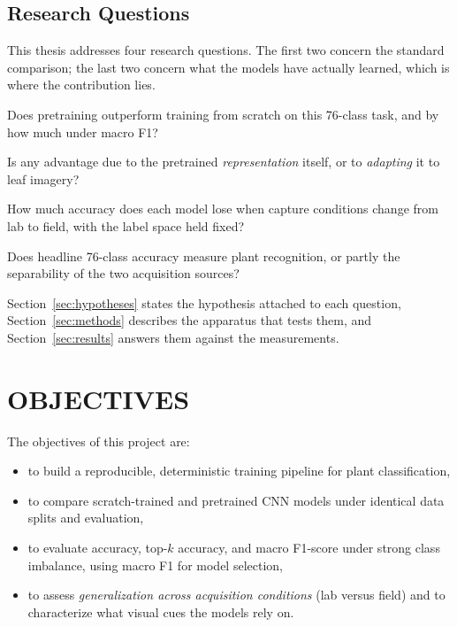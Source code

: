 \documentclass[12pt,a4paper]{article}
\begin{document}
\subsection{Research Questions}
\label{sec:rqs}
This thesis addresses four research questions. The first two concern the standard comparison; the last two concern what the models have actually learned, which is where the contribution lies.

\begin{description}[leftmargin=1.6cm,style=nextline]
    \item[\textbf{RQ1}] Does pretraining outperform training from scratch on this 76-class task, and by how much under macro F1?
    \item[\textbf{RQ2}] Is any advantage due to the pretrained \emph{representation} itself, or to \emph{adapting} it to leaf imagery?
    \item[\textbf{RQ3}] How much accuracy does each model lose when capture conditions change from lab to field, with the label space held fixed?
    \item[\textbf{RQ4}] Does headline 76-class accuracy measure plant recognition, or partly the separability of the two acquisition sources?
\end{description}

\noindent Section~\ref{sec:hypotheses} states the hypothesis attached to each question, Section~\ref{sec:methods} describes the apparatus that tests them, and Section~\ref{sec:results} answers them against the measurements.

\section{OBJECTIVES}
\label{sec:objectives}
The objectives of this project are:
\begin{itemize}
    \item to build a reproducible, deterministic training pipeline for plant classification,
    \item to compare scratch-trained and pretrained CNN models under identical data splits and evaluation,
    \item to evaluate accuracy, top-$k$ accuracy, and macro F1-score under strong class imbalance, using macro F1 for model selection,
    \item to assess \emph{generalization across acquisition conditions} (lab versus field) and to characterize what visual cues the models rely on.
\end{itemize}
\end{document}
